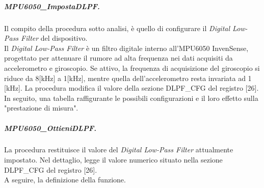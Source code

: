 \documentclass[11pt]{report}
\begin{document}
\subparagraph{MPU6050\_ImpostaDLPF.} 
Il compito della procedura sotto analisi, è quello di configurare il \textit{Digital Low-Pass Filter} del dispositivo.\\
Il \textit{Digital Low-Pass Filter} è un filtro digitale interno all'MPU6050 InvenSense, progettato per attenuare il rumore ad alta frequenza nei dati acquisiti da accelerometro e giroscopio.
Se attivo, la frequenza di acquisizione del giroscopio si riduce da 8[kHz] a 1[kHz], mentre quella dell'accelerometro resta invariata ad 1 [kHz].
La procedura modifica il valore della sezione DLPF\_CFG del registro [26]. In seguito, una tabella raffigurante le possibili configurazioni e il loro effetto sulla "prestazione di misura".
\begin{table}[H]
    \centering
    \caption{Le possibili configurazioni opzionabili del \textit{Digital Low-Pass Filter}.}
    \label{tab: tabella}
\end{table}


\subparagraph{MPU6050\_OttieniDLPF.} 
La procedura restituisce il valore del \textit{Digital Low-Pass Filter} attualmente impostato. Nel dettaglio, legge il valore numerico situato nella sezione\\
DLPF\_CFG del registro [26].\\
A seguire, la definizione della funzione.

\end{document}
